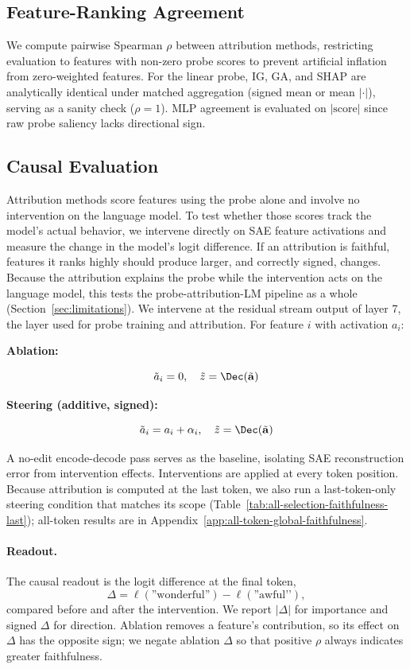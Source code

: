 \subsection{Feature-Ranking Agreement}
We compute pairwise Spearman $\rho$ between attribution methods, restricting evaluation to features with non-zero probe scores to prevent artificial inflation from zero-weighted features. For the linear probe, IG, GA, and SHAP are analytically identical under matched aggregation (signed mean or mean $|\cdot|$), serving as a sanity check ($\rho=1$). MLP agreement is evaluated on $|\text{score}|$ since raw probe saliency lacks directional sign.

\subsection{Causal Evaluation}
Attribution methods score features using the probe alone and involve no intervention on the language model. To test whether those scores track the model’s actual behavior, we intervene directly on SAE feature activations and measure the change in the model’s logit difference. If an attribution is faithful, features it ranks highly should produce larger, and correctly signed, changes. Because the attribution explains the probe while the intervention acts on the language model, this tests the probe-attribution-LM pipeline as a whole (Section~\ref{sec:limitations}). We intervene at the residual stream output of layer 7, the layer used for probe training and attribution. For feature $i$ with activation $a_i$:

\textbf{Ablation:}


$$\tilde{a}_i = 0, \quad \tilde{z} = \Dec(\tilde{\mathbf{a}})$$

\noindent\textbf{Steering (additive, signed):}


$$\tilde{a}_i = a_i + \alpha_i, \quad \tilde{z} = \Dec(\tilde{\mathbf{a}})$$

A no-edit encode-decode pass serves as the baseline, isolating SAE reconstruction error from intervention effects. Interventions are applied at every token position. Because attribution is computed at the last token, we also run a last-token-only steering condition that matches its scope (Table~\ref{tab:all-selection-faithfulness-last}); all-token results are in Appendix~\ref{app:all-token-global-faithfulness}.

\paragraph{Readout.} The causal readout is the logit difference at the final token,
\begin{equation*}
\Delta = \ell(\text{''wonderful''}) - \ell(\text{''awful’’}),
\end{equation*}
compared before and after the intervention. We report $|\Delta|$ for importance and signed $\Delta$ for direction. Ablation removes a feature’s contribution, so its effect on $\Delta$ has the opposite sign; we negate ablation $\Delta$ so that positive $\rho$ always indicates greater faithfulness.


